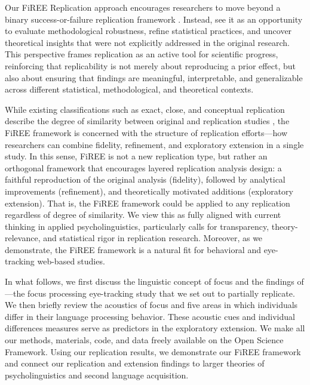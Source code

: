 Our FiREE Replication approach encourages researchers to move beyond a binary success-or-failure replication framework \parencite{Nosek_Errington2020}. Instead, see it as an opportunity to evaluate methodological robustness, refine statistical practices, and uncover theoretical insights that were not explicitly addressed in the original research. This perspective frames replication as an active tool for scientific progress, reinforcing that replicability is not merely about reproducing a prior effect, but also about ensuring that findings are meaningful, interpretable, and generalizable across different statistical, methodological, and theoretical contexts.

While existing classifications such as exact, close, and conceptual replication describe the degree of similarity between original and replication studies \parencite{marsden2018, porte2018, mcmanus2024}, the FiREE framework is concerned with the structure of replication efforts—how researchers can combine fidelity, refinement, and exploratory extension in a single study. In this sense, FiREE is not a new replication type, but rather an orthogonal framework that encourages layered replication analysis design: a faithful reproduction of the original analysis (fidelity), followed by analytical improvements (refinement), and theoretically motivated additions (exploratory extension). That is, the FiREE framework could be applied to any replication regardless of degree of similarity. We view this as fully aligned with current thinking in applied psycholinguistics, particularly calls for transparency, theory-relevance, and statistical rigor in replication research. Moreover, as we demonstrate, the FiREE framework is a natural fit for behavioral and eye-tracking web-based studies.

In what follows, we first discuss the linguistic concept of focus and the findings of \cite{ge2021a}---the focus processing eye-tracking study that we set out to partially replicate. We then briefly review the acoustics of focus and five areas in which individuals differ in their language processing behavior. These acoustic cues and individual differences measures serve as predictors in the exploratory extension. We make all our methods, materials, code, and data freely available on the Open Science Framework. Using our \cite{ge2021a} replication results, we demonstrate our FiREE framework and connect our replication and extension findings to larger theories of psycholinguistics and second language acquisition. 

